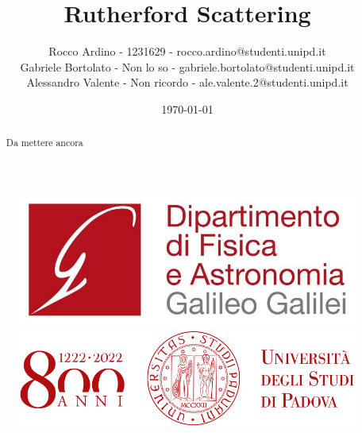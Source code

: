 \begin{figure}[H]
    \begin{minipage}{0.25\linewidth}
        \includegraphics[width=\linewidth]{../titlepage/images/logo_DFA.jpg}
    \end{minipage}
    \hfill
    \begin{minipage}{0.35\linewidth}
        \includegraphics[width=\textwidth]{../titlepage/images/logo_800anni.png}
    \end{minipage}
\end{figure}

\noindent\makebox[\linewidth]{\color{linescolor} \rule{0.85\paperwidth}{1.2 pt}}
\noindent\makebox[\linewidth]{\color{linescolor} \rule[0.3cm]{0.85\paperwidth}{1pt}}

\title{Rutherford Scattering}
\author{
    Rocco Ardino - 1231629 - rocco.ardino@studenti.unipd.it\\
    Gabriele Bortolato - Non lo so - gabriele.bortolato@studenti.unipd.it\\
    Alessandro Valente - Non ricordo - ale.valente.2@studenti.unipd.it
}
\date{\today}

\begin{abstract}
    Da mettere ancora
\end{abstract}

\maketitle

\noindent\makebox[\linewidth]{\color{linescolor} \rule[0.1cm]{0.85\paperwidth}{1pt}}

{
    \hypersetup{linkcolor=black}
    \tableofcontents
}
\noindent\makebox[\linewidth]{\color{linescolor} \rule[-0.2cm]{0.85\paperwidth}{1pt}}
\noindent\makebox[\linewidth]{\color{linescolor} \rule[0.3cm]{0.85\paperwidth}{1.2 pt}}
\pagebreak

\newpage
{}
